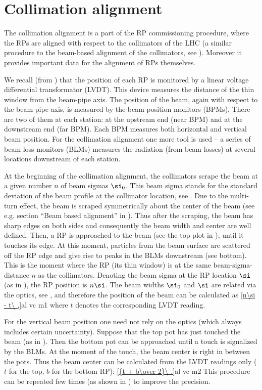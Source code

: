 \section[al collim]{Collimation alignment}

The collimation alignment is a part of the RP commissioning procedure, where the RPs are aligned with respect to the collimators of the LHC (a similar procedure to the beam-based alignment of the collimators, see ). Moreover it provides important data for the alignment of RPs themselves.

We recall (from ) that the position of each RP is monitored by a linear voltage differential transformator (LVDT). This device measures the distance of the thin window from the beam-pipe axis. The position of the beam, again with respect to the beam-pipe axis, is measured by the beam position monitors (BPMs). There are two of them at each station: at the upstream end (near BPM) and at the downstream end (far BPM). Each BPM measures both horizontal and vertical beam position. For the collimation alignment one more tool is used -- a series of beam loss monitors (BLMs) measures the radiation (from beam losses) at several locations downstream of each station.

At the beginning of the collimation alignment, the collimators scrape the beam at a given number $n$ of beam sigmas $\si_0$. This beam sigma stands for the standard deviation of the beam profile at the collimator location, see . Due to the multi-turn effect, the beam is scraped symmetrically about the center of the beam (see e.g. section ``Beam based alignment'' in ). Thus after the scraping, the beam has sharp edges on both sides and consequently the beam width and center are well defined. Then, a RP is approached to the beam (see the top plot in ), until it touches its edge. At this moment, particles from the beam surface are scattered off the RP edge and give rise to peaks in the BLMs downstream (see  bottom). This is the moment where the RP (its thin window) is at the same beam-sigma-distance $n$ as the collimators. Denoting the beam sigma at the RP location $\si$ (as in ), the RP position is $n\si$. The beam widths $\si_0$ and $\si$ are related via the optics, see , and therefore the position of the beam can be calculated as
\eqref{n\si - t\ ,}{al vc m1}
where $t$ denotes the corresponding LVDT reading.

For the vertical beam position one need not rely on the optics (which always includes certain uncertainty). Suppose that the top pot has just touched the beam (as in ). Then the bottom pot can be approached until a touch is signalized by the BLMs. At the moment of the touch, the beam center is right in between the pots. Thus the beam center can be calculated from the LVDT readings only ($t$ for the top, $b$ for the bottom RP):
\eqref{{t + b\over 2}\ .}{al vc m2}
This procedure can be repeated few times (as shown in ) to improve the precision.


